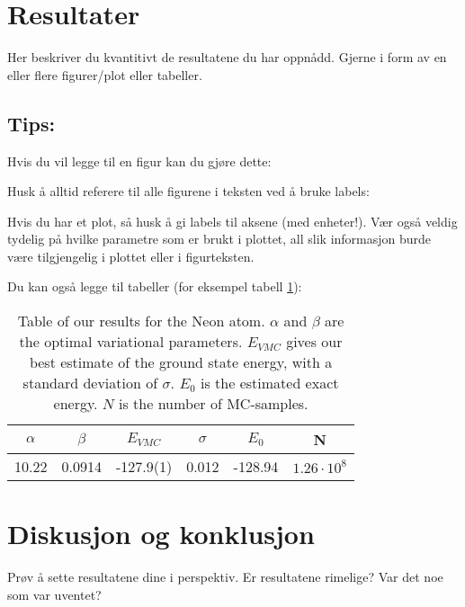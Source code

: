 \documentclass[a4paper,10pt]{article}
\begin{document}
\section{Resultater}

Her beskriver du kvantitivt de resultatene du har oppnådd. Gjerne i form av en eller flere figurer/plot eller tabeller. 

\subsection{Tips:}
Hvis du vil legge til en figur kan du gjøre dette: 

Husk å alltid referere til alle figurene i teksten ved å bruke labels: %

Hvis du har et plot, så husk å gi labels til aksene (med enheter!). Vær også veldig tydelig på hvilke parametre som er brukt i plottet, all slik informasjon burde være tilgjengelig i plottet eller i figurteksten. 

Du kan også legge til tabeller (for eksempel tabell \ref{NeonTable}):
\begin{table}[ht]
\begin{tabular}{ c | c | c | c | c |c }
  $\alpha$ & $\beta$ & $E_{VMC}$ & $\sigma$ & $E_0$& N  \\
\hline
  10.22 & 0.0914   & -127.9(1) & 0.012 & -128.94 & $1.26\cdotp10^8$\\
\end{tabular}
\caption{Table of our results for the Neon atom. $\alpha$ and $\beta$ are the optimal variational parameters. $E_{VMC}$ gives our best estimate of the ground state energy, with a standard deviation of $\sigma$. $E_0$ is the estimated exact energy. $N$ is the number of MC-samples.\label{NeonTable}}
\end{table}

\section{Diskusjon og konklusjon}

Prøv å sette resultatene dine i perspektiv. Er resultatene rimelige? Var det noe som var uventet? 
\end{document}
